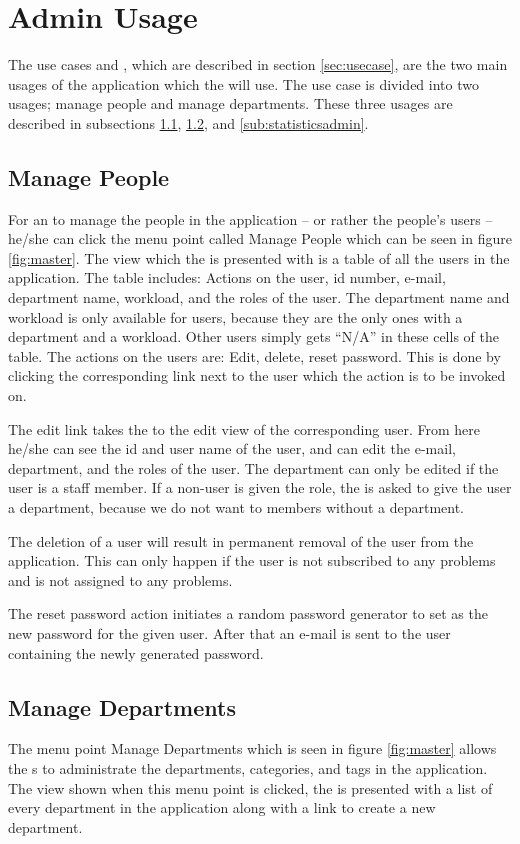 \section{Admin Usage}
\label{sec:admin_usage}
The use cases \tucadmin[] and \gstat[], which are described in section \ref{sec:usecase}, are the two main usages of the application which the \admin[] will use.
The \tucadmin[] use case is divided into two usages; manage people and manage departments.
These three usages are described in subsections \ref{sub:managePeople}, \ref{sub:managedep}, and \ref{sub:statisticsadmin}.

\subsection{Manage People}
\label{sub:managePeople}
For an \admin[] to manage the people in the application -- or rather the people's users -- he/she can click the menu point called Manage People which can be seen in figure \ref{fig:master}.
The view which the \admin[] is presented with is a table of all the users in the application.
The table includes: Actions on the user, id number, e-mail, department name, workload, and the roles of the user.
The department name and workload is only available for \astaff[] users, because they are the only ones with a department and a workload.
Other users simply gets ``N/A'' in these cells of the table.
The actions on the users are: Edit, delete, reset password.
This is done by clicking the corresponding link next to the user which the action is to be invoked on.

The edit link takes the \admin[] to the edit view of the corresponding user.
From here he/she can see the id and user name of the user, and can edit the e-mail, department, and the roles of the user.
The department can only be edited if the user is a staff member.
If a non-\astaff[] user is given the \astaff[] role, the \admin[] is asked to give the user a department, because we do not want to \astaff[] members without a department.

The deletion of a user will result in permanent removal of the user from the application.
This can only happen if the user is not subscribed to any problems and is not assigned to any problems.

The reset password action initiates a random password generator to set as the new password for the given user.
After that an e-mail is sent to the user containing the newly generated password.

\subsection{Manage Departments}
\label{sub:managedep}
The menu point Manage Departments which is seen in figure \ref{fig:master} allows the \admin[]s to administrate the departments, categories, and tags in the application.
The view shown when this menu point is clicked, the \admin[] is presented with a list of every department in the application along with a link to create a new department.

